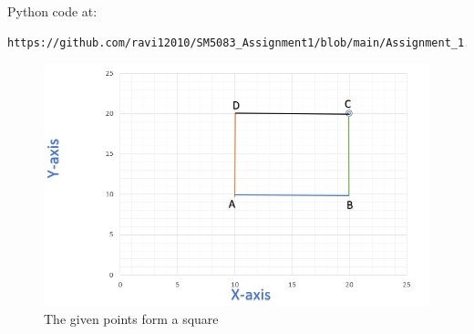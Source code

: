 \documentclass[journal,12pt,twocolumn]{IEEEtran}
\begin{document}
\newline Python code at:
\begin{lstlisting}
https://github.com/ravi12010/SM5083_Assignment1/blob/main/Assignment_1.ipynb
\end{lstlisting}
\begin{figure}[!ht]
	\centering
	\includegraphics[width=\columnwidth]{square.jpg}
	\caption{The given points form a square}
	\label{fig:Square}
\end{figure}
\end{document}
